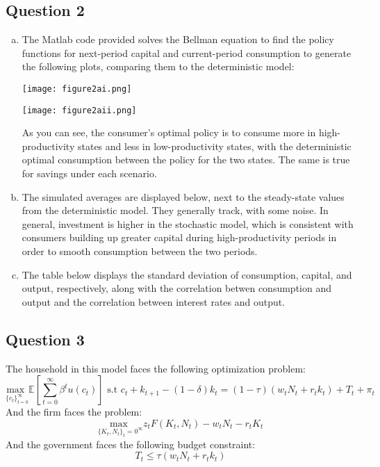 \documentclass{article}
\newcommand{\usmax}[1]{\underset{#1}{\text{max }}}
\newcommand{\E}[1]{\mathbb{E}\left[#1\right]} %
\begin{document}

\subsection*{Question 2}

\begin{enumerate}[(a)]
	\item The Matlab code provided solves the Bellman equation to find the policy functions for next-period capital and current-period consumption to generate the following plots, comparing them to the deterministic model:
		\begin{center}
			\texttt{[image: figure2ai.png]}
		\end{center}
		\begin{center}
			\texttt{[image: figure2aii.png]}
		\end{center}
		As you can see, the consumer's optimal policy is to consume more in high-productivity states and less in low-productivity states, with the deterministic optimal consumption between the policy for the two states. The same is true for savings under each scenario.
	
	\item The simulated averages are displayed below, next to the steady-state values from the deterministic model. They generally track, with some noise. In general, investment is higher in the stochastic model, which is consistent with consumers building up greater capital during high-productivity periods in order to smooth consumption between the two periods.
		
	
	
	\item The table below displays the standard deviation of consumption, capital, and output, respectively, along with the correlation betwen consumption and output and the correlation between interest rates and output.
		
	
	
\end{enumerate}


\subsection*{Question 3}
The household in this model faces the following optimization problem:
\[
	\usmax{\{c_t\}_{t=0}^\infty}\E{\sum_{t=0}^\infty \beta^tu(c_t)}\text{ s.t }c_t + k_{t+1} - (1-\delta)k_t = (1-\tau)\left(w_tN_t + r_tk_t\right) + T_t + \pi_t
\]
And the firm faces the problem:
\[
	\usmax{\{K_t,N_t\}_t=0^\infty}z_tF(K_t,N_t) - w_tN_t - r_tK_t
\]
And the government faces the following budget constraint:
\[
	T_t \leq \tau(w_tN_t + r_tk_t)
\]
\end{document}
